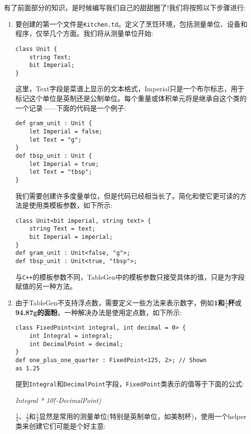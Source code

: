 有了前面部分的知识，是时候编写我们自己的甜甜圈了!我们将按照以下步骤进行:

\begin{enumerate}
\item 要创建的第一个文件是\texttt{Kitchen.td}。定义了烹饪环境，包括测量单位、设备和程序，仅举几个方面。我们将从测量单位开始:

\begin{lstlisting}[style=styleCXX]
class Unit {
	string Text;
	bit Imperial;
}
\end{lstlisting}

这里，Text字段是菜谱上显示的文本格式，Imperial只是一个布尔标志，用于标记这个单位是英制还是公制单位。每个重量或体积单元将是继承自这个类的一个记录——下面的代码是一个例子:

\begin{lstlisting}[style=styleCXX]
def gram_unit : Unit {
	let Imperial = false;
	let Text = "g";
}
def tbsp_unit : Unit {
	let Imperial = true;
	let Text = "tbsp";
}
\end{lstlisting}

我们需要创建许多度量单位，但是代码已经相当长了。简化和使它更可读的方法是使用类模板参数，如下所示:

\begin{lstlisting}[style=styleCXX]
class Unit<bit imperial, string text> {
	string Text = text;
	bit Imperial = imperial;
}
def gram_unit : Unit<false, "g">;
def tbsp_unit : Unit<true, "tbsp">;
\end{lstlisting}

与\texttt{C++}的模板参数不同，TableGen中的模板参数只接受具体的值，只是为字段赋值的另一种方法。

\item 由于TableGen不支持浮点数，需要定义一些方法来表示数字，例如\textbf{1和$\frac{1}{4}$杯}或\textbf{94.87g的面粉}。一种解决办法是使用定点数，如下所示:

\begin{lstlisting}[style=styleCXX]
class FixedPoint<int integral, int decimal = 0> {
	int Integral = integral;
	int DecimalPoint = decimal;
}
def one_plus_one_quarter : FixedPoint<125, 2>; // Shown
as 1.25
\end{lstlisting}

提到\texttt{Integral}和\texttt{DecimalPoint}字段，\texttt{FixedPoint}类表示的值等于下面的公式:

\textit{Integral * 10\^(-DecimalPoint)}

$\frac{1}{4}$、$\frac{1}{2}$和$\frac{3}{4}$显然是常用的测量单位(特别是英制单位，如美制杯)，使用一个helper类来创建它们可能是个好主意:


\end{enumerate}
